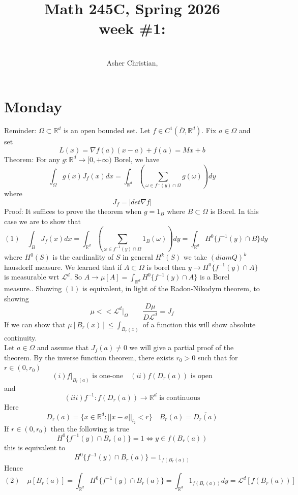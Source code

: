 \documentclass[11pt]{article}
\newcommand{\cnum}{Math 245C}
\newcommand{\ced}{Spring 2026}
\newcommand{\ctitle}[4]{\title{\vspace{-0.5in}\cnum, \ced\\week #1: #2}\author{\vspace{-0.35in}\\#3, #4}}
\begin{document}
\ctitle{\#1}{}{Asher Christian}{}
\date{}
\maketitle

\section{Monday}
Reminder: $\Omega \subset \mathbb{R}^{d}$ is an open bounded set.
Let $f \in C^{1}(\overline{\Omega}, \mathbb{R}^{d})$. Fix $a \in \Omega$ and set 
 \[
L(x) = \nabla f(a)(x-a) + f(a) = Mx + b
\] 
Theorem: For any $g: \mathbb{R}^{d} \to [0,+\infty)$ Borel, we have
\[
\int_{\Omega}^{}g(x) J_f(x)dx = \int_{ \mathbb{R}^{d}}^{} \left(\sum_{\omega \in f^{-}(y) \cap \Omega}^{}g(\omega) \right) dy
\] 
where
\[
J_f = |det \nabla f |
\] 
Proof: It suffices to prove the theorem when  $g = 1_B$ where  $B \subset \Omega$ is Borel.
In this case we are to show that
\[
    (1) \quad    \int_{B}^{}J_f(x)dx = \int_{ \mathbb{R}^{d}}^{} \left(\sum_{\omega \in f^{-1}(y) \cap \Omega}^{}1_B(\omega)\right) dy = \int_{ \mathbb{R}^{d}}^{}H^{0} \{f^{-1}(y) \cap B\} dy
\] 
where $H^{0}(S)$ is the cardinality of $S$ in general  $H^{k}(S)$ we take $(diam Q)^{k}$ hausdorff measure.
We learned that if $A \subset \Omega$ is borel then $y \to H^{0}\{f^{-1}(y) \cap A\}$ is measurable wrt $ \mathcal{L}^{d}$.
So $A \to \mu[A] = \int_{ \mathbb{R}^{d}}^{} H^{0}\{f^{-1}(y) \cap A\}$ is a Borel measure..
Showing $(1)$ is equivalent, in light of the Radon-Nikodym theorem, to showing
 \[
\mu << \mathcal{L}^{d}|_\Omega \qquad \frac{D \mu}{D \mathcal{L}^{d}} = J_f
\]
If we can show that $\mu[B_r(x)] \le \int_{B_r(x)}^{}$ of a function this will show absolute continuity.\\
Let $a \in \Omega$ and assume that  $J_f(a) \ne 0$ we will give a partial proof of the theorem.
By the inverse function theorem, there exists $r_0 > 0$ such that for  $r \in (0,r_0)$ 
\[
    (i) f|_{B_r(a)} \text{ is one-one} \quad (ii) f(D_r(a)) \text{ is open} 
\] 
and 
\[
    (iii) f^{-1}: f(D_r(a)) \to \mathbb{R}^{d} \text{ is continuous}
\] 
Here
\[
    D_r(a) = \{x \in \mathbb{R}^{d} :  ||x-a||_{l_2} < r\} \quad B_r(a) = \overline{ D_r(a)}
\] 
If $r \in (0,r_0)$ then the following is true
\[
    H^{0}\{f^{-1}(y) \cap B_r(a)\}  = 1 \iff y \in f(B_r(a))
\] 
this is equivalent to 
\[
    H^{0}\{f^{-1}(y) \cap B_r(a)\} = 1_{f(B_r(a))}
\] 
Hence
\[
    (2) \quad    \mu[B_r(a)] = \int_{ \mathbb{R}^{d}}^{}H^{0}\{f^{-1}(y) \cap B_r(a)\} = \int_{ \mathbb{R}^{d}}^{} 1_{f(B_r(a))} dy = \mathcal{L}^{d}[f(B_r(a))]
\] 
\end{document}
